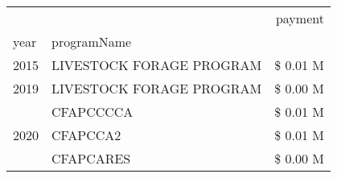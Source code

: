 \begin{tabular}{llr}
\toprule
 &  & payment \\
year & programName &  \\
\midrule
2015 & LIVESTOCK FORAGE PROGRAM & \$ 0.01 M \\
\cline{1-3}
2019 & LIVESTOCK FORAGE PROGRAM & \$ 0.00 M \\
\cline{1-3}
\multirow[t]{3}{*}{2020} & CFAPCCCCA & \$ 0.01 M \\
 & CFAPCCA2 & \$ 0.01 M \\
 & CFAPCARES & \$ 0.00 M \\
\cline{1-3}
\bottomrule
\end{tabular}
